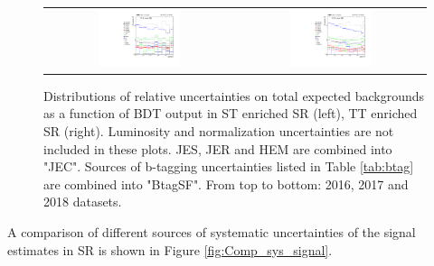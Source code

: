 \begin{figure}[tbh!]
\begin{center}
\begin{tabular}{cc}
    \includegraphics[width=0.45\textwidth]{figures/Part3/Systematics/sysBDT_ST_bkg_2018}&
  \includegraphics[width=0.45\textwidth]{figures/Part3/Systematics/sysBDT_TT_bkg_2018} \\
 \end{tabular}
 \caption{Distributions of relative uncertainties on total expected backgrounds as a function of BDT output in ST enriched SR (left), TT enriched SR (right). Luminosity and normalization uncertainties are not included in these plots. JES, JER and HEM are combined into "JEC". Sources of b-tagging uncertainties listed in Table \ref{tab:btag} are combined into "BtagSF". From top to bottom: 2016, 2017 and 2018 datasets.}
 \label{fig:Comp_sys_background}
 \end{center}
\end{figure}

 A comparison of different sources of systematic uncertainties of the signal estimates in SR is shown in Figure \ref{fig:Comp_sys_signal}.

